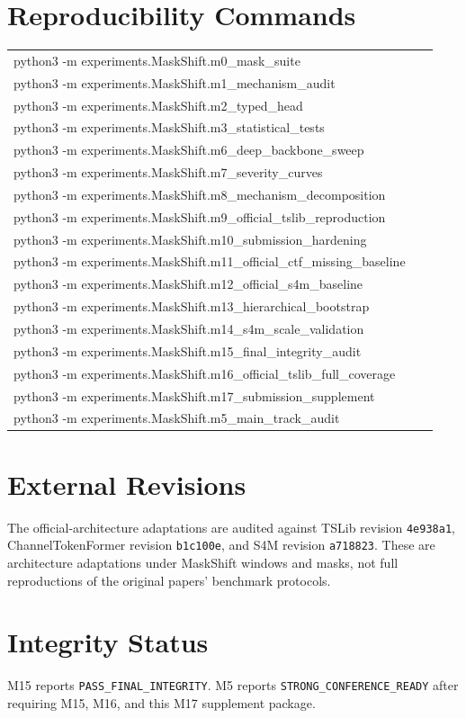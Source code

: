 \documentclass[10pt]{article}
\begin{document}
\section{Reproducibility Commands}
\small
\begin{tabular}{p{0.95\linewidth}}
python3 -m experiments.MaskShift.m0\_mask\_suite\\
python3 -m experiments.MaskShift.m1\_mechanism\_audit\\
python3 -m experiments.MaskShift.m2\_typed\_head\\
python3 -m experiments.MaskShift.m3\_statistical\_tests\\
python3 -m experiments.MaskShift.m6\_deep\_backbone\_sweep\\
python3 -m experiments.MaskShift.m7\_severity\_curves\\
python3 -m experiments.MaskShift.m8\_mechanism\_decomposition\\
python3 -m experiments.MaskShift.m9\_official\_tslib\_reproduction\\
python3 -m experiments.MaskShift.m10\_submission\_hardening\\
python3 -m experiments.MaskShift.m11\_official\_ctf\_missing\_baseline\\
python3 -m experiments.MaskShift.m12\_official\_s4m\_baseline\\
python3 -m experiments.MaskShift.m13\_hierarchical\_bootstrap\\
python3 -m experiments.MaskShift.m14\_s4m\_scale\_validation\\
python3 -m experiments.MaskShift.m15\_final\_integrity\_audit\\
python3 -m experiments.MaskShift.m16\_official\_tslib\_full\_coverage\\
python3 -m experiments.MaskShift.m17\_submission\_supplement\\
python3 -m experiments.MaskShift.m5\_main\_track\_audit\\
\end{tabular}
\normalsize

\section{External Revisions}
The official-architecture adaptations are audited against TSLib revision \texttt{4e938a1}, ChannelTokenFormer revision \texttt{b1c100e}, and S4M revision \texttt{a718823}. These are architecture adaptations under MaskShift windows and masks, not full reproductions of the original papers' benchmark protocols.

\section{Integrity Status}
M15 reports \texttt{PASS\_FINAL\_INTEGRITY}. M5 reports \texttt{STRONG\_CONFERENCE\_READY} after requiring M15, M16, and this M17 supplement package.
\end{document}
